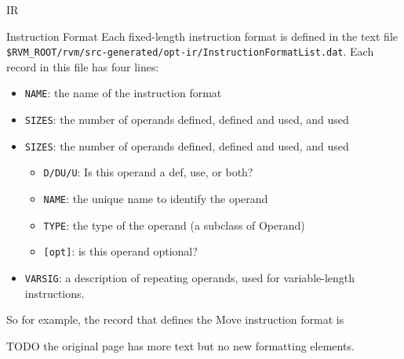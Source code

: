 \begin{section}{IR}
\begin{subsection}{Instruction Format}
Each fixed-length instruction format is defined in the text file \verb#$RVM_ROOT/rvm/src-generated/opt-ir/InstructionFormatList.dat#. Each record in this file has four lines:

\begin{itemize}
\item \verb#NAME#: the name of the instruction format
\item \verb#SIZES#: the number of operands defined, defined and used, and used
\item \verb#SIZES#: the number of operands defined, defined and used, and used
      \begin{itemize}
        \item \verb#D/DU/U#: Is this operand a def, use, or both?
        \item \verb#NAME#: the unique name to identify the operand
        \item \verb#TYPE#: the type of the operand (a subclass of Operand)
        \item \verb#[opt]#: is this operand optional?
      \end{itemize}
\item \verb#VARSIG#: a description of repeating operands, used for variable-length instructions.
\end{itemize}


So for example, the record that defines the Move instruction format is

TODO the original page has more text but no new formatting elements.

\end{subsection}

\end{section}